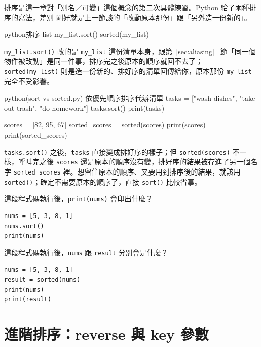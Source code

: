 排序是這一章對「別名／可變」這個概念的第二次具體練習。Python 給了兩種排序的寫法，差別
剛好就是上一節談的「改動原本那份」跟「另外造一份新的」。

\begin{code}{python}{排序 list}
my_list.sort()
sorted(my_list)
\end{code}

\texttt{my\_list.sort()} 改的是 \texttt{my\_list} 這份清單本身，跟第~\ref{sec:aliasing}~
節「同一個物件被改動」是同一件事，排序完之後原本的順序就回不去了；
\texttt{sorted(my\_list)}
則是造一份新的、排好序的清單回傳給你，原本那份 \texttt{my\_list} 完全不受影響。

\begin{example}{python}{(sort-vs-sorted.py) 依優先順序排序代辦清單}
tasks = ["wash dishes", "take out trash", "do homework"]
tasks.sort()
print(tasks)

scores = [82, 95, 67]
sorted_scores = sorted(scores)
print(scores)
print(sorted_scores)
\end{example}


\texttt{tasks.sort()} 之後，\texttt{tasks} 直接變成排好序的樣子；但 \texttt{sorted(scores)}
不一樣，呼叫完之後 \texttt{scores} 還是原本的順序沒有變，排好序的結果被存進了另一個名字
\texttt{sorted\_scores} 裡。想留住原本的順序、又要用到排序後的結果，就該用
\texttt{sorted()}；確定不需要原本的順序了，直接 \texttt{sort()} 比較省事。

\begin{drills}[label=drills:sort-vs-sorted]
\item 這段程式碼執行後，\texttt{print(nums)} 會印出什麼？
\begin{verbatim}
nums = [5, 3, 8, 1]
nums.sort()
print(nums)
\end{verbatim}
\item 這段程式碼執行後，\texttt{nums} 跟 \texttt{result} 分別會是什麼？
\begin{verbatim}
nums = [5, 3, 8, 1]
result = sorted(nums)
print(nums)
print(result)
\end{verbatim}
\end{drills}

\section{進階排序：reverse 與 key 參數}
\label{sec:sort-key}

